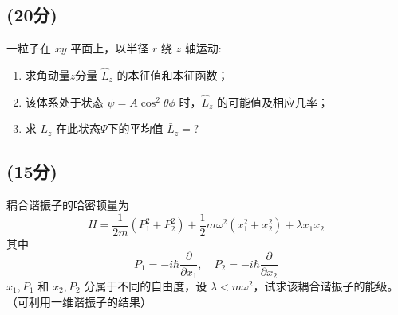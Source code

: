 \subsection{(20分)}
一粒子在 $xy$ 平面上，以半径 $r$ 绕 $z$ 轴运动:
\begin{enumerate}
  \item 求角动量$z$分量 $\hat{L}_z$ 的本征值和本征函数；
  \item 该体系处于状态 $\psi = A \cos^2 \theta \phi$ 时，$\hat{L}_z$ 的可能值及相应几率；
  \item 求 $L_z$ 在此状态$\Psi$下的平均值 $\bar{L}_z = ?$
\end{enumerate}
\subsection{(15分)}
耦合谐振子的哈密顿量为
\[H = \frac{1}{2m}(P_1^2 + P_2^2) + \frac{1}{2} m \omega^2 (x_1^2 + x_2^2) + \lambda x_1 x_2~\]
其中
\[P_1 = -i \hbar \frac{\partial}{\partial x_1}, \quad P_2 = -i \hbar \frac{\partial}{\partial x_2}~\]
$x_1, P_1$ 和 $x_2, P_2$ 分属于不同的自由度，设 $\lambda < m\omega^2$，试求该耦合谐振子的能级。（可利用一维谐振子的结果）